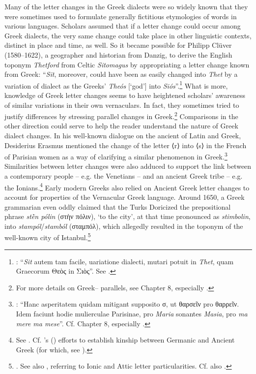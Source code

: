 Many of the letter changes in the Greek dialects were so widely known that they were sometimes used to formulate generally fictitious etymologies of words in various languages. Scholars assumed that if a letter change could occur among Greek dialects, the very same change could take place in other linguistic contexts, distinct in place and time, as well. So it became possible for Philipp Clüver (1580–1622), a geographer and historian from Danzig, to derive the English toponym \textit{Thetford} from Celtic \textit{Sitomagus} by appropriating a letter change known from Greek: “\textit{Sit}, moreover, could have been as easily changed into \textit{Thet} by a variation of dialect as the Greeks’ \textit{Theós} [`god'] into \textit{Siós}”.\footnote{{\citet[64]{Cluver1616}: “}{\textit{Sit}} {autem tam facile, uariatione dialecti, mutari potuit in} {\textit{Thet}}{, quam Graecorum Θεὸς in Σιὸς”. See \citet[114--115]{Metcalf2013}.}} What is more, knowledge of Greek letter changes seems to have heightened scholars’ awareness of similar variations in their own vernaculars. In fact, they sometimes tried to justify  differences by stressing parallel changes in Greek.\footnote{{For more details on Greek– parallels, see Chapter 8, especially .}} Comparisons in the other direction could serve to help the reader understand the nature of Greek dialect changes. In his well-known dialogue on the ancient  of Latin and Greek, Desiderius Erasmus mentioned the change of the letter ⟨r⟩ into ⟨s⟩ in the French of Parisian women as a way of clarifying a similar phenomenon in Greek.\footnote{{\citet[52]{Erasmus1528}: “Hanc asperitatem quidam mitigant supposito σ, ut θαρσεῖν pro θαρρεῖν. Idem faciunt hodie mulierculae Parisinae, pro} {\textit{Maria}} {sonantes} {\textit{Masia}}{, pro} {\textit{ma mere ma mese}}{”. Cf. Chapter 8, especially .}} Similarities between letter changes were also adduced to support the link between a contemporary people – e.g. the Venetians – and an ancient Greek tribe – e.g. the Ionians.\footnote{{See . Cf. \citeauthor{Reitz1730}'s (\citeyear[e.g., 122, 125, 126–127]{Reitz1730}) efforts to establish kinship between Germanic and Ancient Greek (for which, see \citealt{VanHal2016}).}} Early modern Greeks also relied on Ancient Greek letter changes to account for properties of the Vernacular Greek language. Around 1650, a Greek grammarian even oddly claimed that the Turks Doricized the prepositional phrase \textit{stḕn pólin} (στὴν πόλιν), ‘to the city’, at that time pronounced as \textit{stimbolin}, into \textit{stampól}/\textit{stamból} (σταμπόλ), which allegedly resulted in the toponym of the well-known city of Istanbul.\footnote{{\citet[14]{Nikiforos1908}. See also \citet[35]{Nikiforos1908}, referring to Ionic and Attic letter particularities. Cf.} also \citet[\textsc{a.4}\textsc{\textsuperscript{r}}]{Rodigast1685}.}

